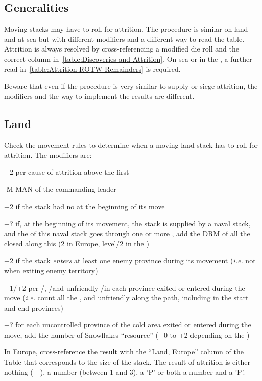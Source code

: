 \subsection{Generalities}
Moving stacks may have to roll for attrition. The procedure is similar on land
and at sea but with different modifiers and a different way to read the
table. Attrition is always resolved by cross-referencing a modified die roll
and the correct column in~\ref{table:Discoveries and Attrition}. On sea or in
the \ROTW, a further read in~\ref{table:Attrition ROTW Remainders} is
required.

Beware that even if the procedure is very similar to supply or siege
attrition, the modifiers and the way to implement the results are different.

\subsection{Land}
Check the movement rules to determine when a moving land stack has to roll for
attrition. The modifiers are:
\begin{modlist}
\item[+2] per cause of attrition above the first
\item[-M] MAN of the commanding leader
\item[+2] if the stack had no \LoS at the beginning of its move
\item[+?] if, at the beginning of its movement, the stack is supplied by a
  naval stack, and the \LoS of this naval stack goes through one or more
  \StraitFort, add the DRM of all the closed \StraitFort along this \LoS (2 in
  Europe, level/2 in the \ROTW)
\item[+2] if the stack \emph{enters} at least one enemy province during its
  movement (\emph{i.e.}  not when exiting enemy territory)
\item[+1/+2] per \PILLAGE\Facemoins/\Faceplus, \REVOLT\Facemoins/\Faceplus and
  unfriendly \REBELLION\Facemoins/\Faceplus in each province exited or entered
  during the move (\emph{i.e.} count all the \PILLAGE, \REVOLT and unfriendly
  \REBELLION along the path, including in the start and end provinces)
\item[+?] for each uncontrolled province of the \ROTW cold area exited or
  entered during the move, add the number of Snowflakes ``resource'' (+0 to +2
  depending on the \Area)
\end{modlist}

In Europe, cross-reference the result with the ``Land, Europe'' column of the
Table that corresponds to the size of the stack. The result of attrition is
either nothing (---), a number (between 1 and 3), a 'P' or both a number and a
'P'.

